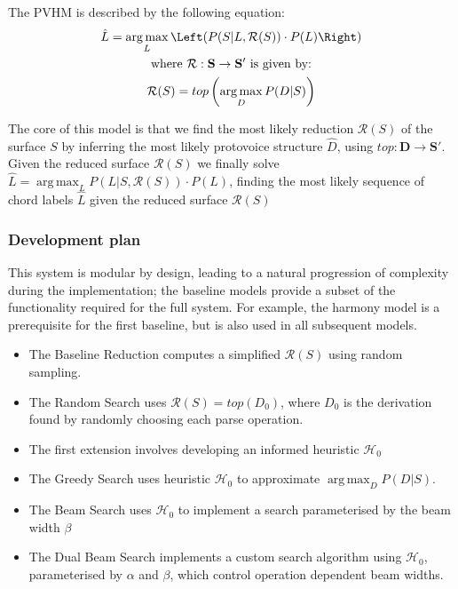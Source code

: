\documentclass[12pt,a4paper,twoside,openright]{report}
\DeclareMathOperator*{\argmax}{arg\,max}
\theoremstyle{definition}
\begin{document}

The PVHM is described by the following equation: 
\begin{equation}
  \label{eq:pvhmSuccinct}
  \begin{gathered}
  \hat{L} = \argmax_L \Left( P(S|L, \mathcal{R}(S)) \cdot P(L) \Right)\\
  \text{where $\mathcal{R}: \mathbf{S} \to \mathbf{S'}$ is given by:} \\
  \mathcal{R} (S) = top \left(\argmax_D P(D|S) \right) \\
  \end{gathered}
\end{equation}

The core of this model is that we find the most likely reduction $\mathcal{R}(S)$ of the surface $S$ by inferring the most likely protovoice structure $\hat{D}$, using $top:\mathbf{D} \to \mathbf{S'}$. Given the reduced surface $\mathcal{R}(S)$ we finally solve $\hat{L} = \argmax_L P(L|S, \mathcal{R}(S)) \cdot P(L)$, finding the most likely sequence of chord labels $\hat{L}$ given the reduced surface $\mathcal{R}(S)$

\subsubsection{Development plan}
This system is modular by design, leading to a natural progression of complexity during the implementation; the baseline models provide a subset of the functionality required for the full system. For example, the harmony model is a prerequisite for the first baseline, but is also used in all subsequent models. 

\begin{itemize}
  \item The Baseline Reduction computes a simplified $\mathcal{R}(S)$ using random sampling. 
  \item The Random Search uses $\mathcal{R}(S) = top (D_0)$, where $D_0$ is the derivation found by randomly choosing each parse operation. 
  \item The first extension involves developing an informed heuristic $\mathcal{H}_0$
  \item The Greedy Search uses heuristic $\mathcal{H}_0$ to approximate $\argmax_D P(D|S)$.
  \item The Beam Search uses $\mathcal{H}_0$ to implement a search parameterised by the beam width $\beta$
  \item The Dual Beam Search implements a custom search algorithm using $\mathcal{H}_0$, parameterised by $\alpha$ and $\beta$, which control operation dependent beam widths.  
\end{itemize}
\end{document}
